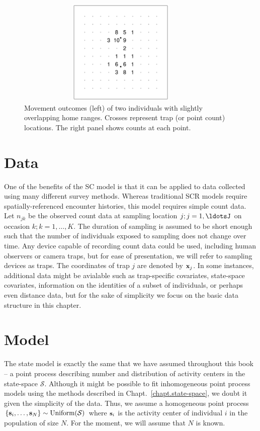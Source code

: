 \begin{figure}
\centering
\includegraphics[width=4in,height=2in]{Ch18-Unmarked/figs/heuristic}
\caption{Movement outcomes (left) of two individuals with slightly
  overlapping home ranges. Crosses represent trap (or point count)
  locations. The right panel shows counts at each point.} %
\label{ch14.fig.heur}
\end{figure}


\section{Data}

One of the benefits of the SC model is that it
can be applied to data collected using many different survey
methods. Whereas traditional SCR models require spatially-referenced
encounter histories, this model requires simple count data.
Let $n_{jk}$ be the observed count data at sampling location $j;
j=1,\ldotsJ$ on occasion $k; k=1,\ldots,K$. The duration of sampling
is assumed to be short enough such that the number of individuals
exposed to sampling does not change over time. Any device capable of
recording count data could be used, including human observers or
camera traps, but for ease of presentation, we will refer to sampling
devices as traps. The coordinates of trap $j$ are denoted by ${\bf
  x}_j$. In some instances, additional data might be avialable such as
trap-specific covariates, state-space covariates,
information on the identities of a subset of individuals, or perhaps
even distance data, but for the sake of simplicity we focus on the
basic data structure in this chapter.

\section{Model}

The state model is exactly the same that we have assumed throughout
this book -- a point process describing number and distribution of
activity centers in the state-space $\mathcal{S}$. Although it might
be possible to fit inhomogeneous point process models using the
methods described in Chapt.~\ref{chapt.state-space}, we doubt it given
the simplicity of the data. Thus, we assume a homogeneous point process
$\{{\bf s}_i, \ldots, {\bf s}_N\} \sim \text{Uniform}(\mathcal{S})$
where ${\bf s}_i$ is the activity center of individual $i$ in the
population of size $N$. For the moment, we will assume that $N$ is
known.


